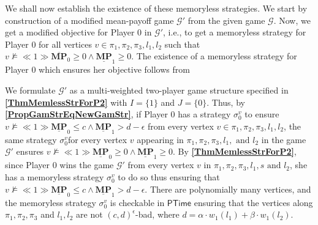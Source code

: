 We shall now establish the existence of these memoryless strategies. 
We start by construction of a modified mean-payoff game $\mathcal{G'}$ from the given game $\mathcal{G}$. Now, we get a modified objective for Player 0 in $\mathcal{G'}$, i.e., to get a memoryless strategy for Player 0 for all vertices $v \in \pi_1, \pi_2, \pi_3, l_1, l_2$ such that $v \nvDash \ll 1 \gg \overline{\mathbf{MP}}_0 \geqslant 0 \land \underline{\mathbf{MP}}_1 \geqslant 0$. The existence of a memoryless strategy for Player 0 which ensures her objective follows from \textbf{}

\noindent We formulate $\mathcal{G'}$ as a multi-weighted two-player game structure specified in \textbf{\cref{ThmMemlessStrForP2}} with $I = \{1\}$ and $J = \{0\}$. 
Thus, by \textbf{\cref{PropGamStrEqNewGamStr}}, if Player 0 has a strategy $\sigma_0^{v}$ to ensure $v \nvDash \ll 1 \gg \underline{\mathbf{MP}}_0 \leqslant c \land \underline{\mathbf{MP}}_1 > d-\epsilon$ from every vertex $v \in \pi_1, \pi_2, \pi_3, l_1, l_2$, the same strategy $\sigma_0^{v}$for every vertex $v$ appearing in $\pi_1, \pi_2, \pi_3, l_1, \text{ and } l_2$ in the game $\mathcal{G'}$ ensures $v \nvDash \ll 1 \gg \underline{\mathbf{MP}}_0 \geqslant 0 \land \underline{\mathbf{MP}}_1 \geqslant 0$. 
By \textbf{\cref{ThmMemlessStrForP2}}, since Player 0 wins the game $\mathcal{G}'$ from every vertex $v$ in $\pi_1, \pi_2, \pi_3, l_1, s \text{ and } l_2$, she has a memoryless strategy $\sigma_0^{v}$ to do so thus ensuring that $v \nvDash \ll 1 \gg \underline{\mathbf{MP}}_0 \leqslant c \land \underline{\mathbf{MP}}_1 > d - \epsilon$. 
There are polynomially many vertices, and the memoryless strategy $\sigma_0^{v}$ is checkable in $\mathsf{PTime}$ ensuring that the vertices along $\pi_1, \pi_2, \pi_3$ and $l_1, l_2$ are not $(c,d)^\epsilon$-bad, where $d = \alpha \cdot w_1(l_1) + \beta \cdot w_1(l_2)$.